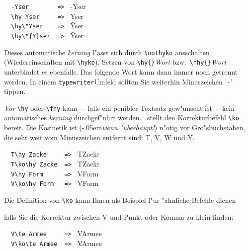 \documentclass[12pt,a4paper]{article}
\begin{document}
\vspace{1.25ex}\noindent
\verb|  -Yser        => | -Yser \\
\verb|  \hy Yser     => | \hy Yser \\
\verb|  \hy\"Yser    => | \hy \"Yser \\
\verb|  \hy\"{Y}ser  => | \hy \"Yser 

\vspace{1.5ex}\noindent
Dieses automatische \textit{kerning} l"asst sich durch \verb|\nothyko| 
ausschalten (Wiedereinschalten mit \verb|\hyko|). Setzen von 
\verb|\hy{}|\hspace{-.15em}\textit{Wort} bzw.\ 
\verb|\fhy{}|\hspace{-.15em}\textit{Wort} unterbindet es ebenfalls. 
Das folgende Wort kann dann immer noch getrennt werden. 
In einem \texttt{typewriter}\hy Umfeld sollten Sie weiterhin 
Minuszeichen '\verb|-|' tippen.

\vspace{1.5ex}\noindent
\hspace*{-.16em}\textit{Vor} \verb|\hy| oder \verb|\fhy| kann 
$-$ falls ein penibler Textsatz gew"unscht ist $-$ kein 
automatisches \textit{kerning} durchgef"uhrt werden. \BibArts\ 
stellt den Korrekturbefehl \verb|\ko| bereit. Die Kosmetik 
ist (\kern-.05em\textit{wenn "uberhaupt!}) n"otig vor Gro"sbuchstaben, die sehr 
weit vom Minuszeichen entfernt sind: T\ko, V\ko, W und Y\ko. 

\vspace{1.25ex}\noindent
\verb|  T\hy Zacke     => | T\hy Zacke    \\
\verb|  T\ko\hy Zacke  => | T\ko\hy Zacke \\
\verb|  V\hy Form      => | V\hy Form     \\
\verb|  V\ko\hy Form   => | V\ko\hy Form

\vspace{1.5ex}\noindent
Die Definition von \verb|\ko| kann Ihnen als Beispiel f"ur "ahnliche Befehle dienen

\vspace{1.25ex}{\small\noindent
\verb|  \newcommand{\pko}{\ifhmode\nobreak\hskip -0.07em plus 0em\fi}| \\
\verb|  \newcommand{\ko}{\protect\pko}|\label{ProtectBeispiel}}

\vspace{1.5ex}\noindent
falls Sie die Korrektur zwischen V und Punkt oder Komma zu klein finden:

\vspace{1.25ex}\noindent
\verb|  V\te Armee     => | V\te Armee    \\
\verb|  V\ko\te Armee  => | V\ko\te Armee
\end{document}
